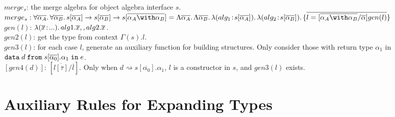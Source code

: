 \documentclass[a4paper]{article}
\begin{document}
~\\

$merge_s$: the merge algebra for object algebra interface $s$.\\

$\mergealg$\\

$gen(l)$: $\lambda (\overline{x} \!:\! ...).\, alg1.\overline{x} ,, alg2.\overline{x}$.\\

$gen2(l)$: get the type from context $\Gamma(s).l$.\\

$gen3(l)$: for each case $l$, generate an auxiliary function for building structures. Only consider those with return type $\alpha_1$ in $\texttt{data} \; d \; \texttt{from} \; s {[} \overline{\alpha_0} {]} . \alpha_1 \; \texttt{in} \; e$.\\

$[gen4(d)]$: $[\overline{l[\overline{\tau}]}/\overline{l}]$. Only when $d \rightsquigarrow s[\overline{\alpha_0}].\alpha_1$, $l$ is a constructor in $s$, and $gen3(l)$ exists.

\section{Auxiliary Rules for Expanding Types}


\end{document}
